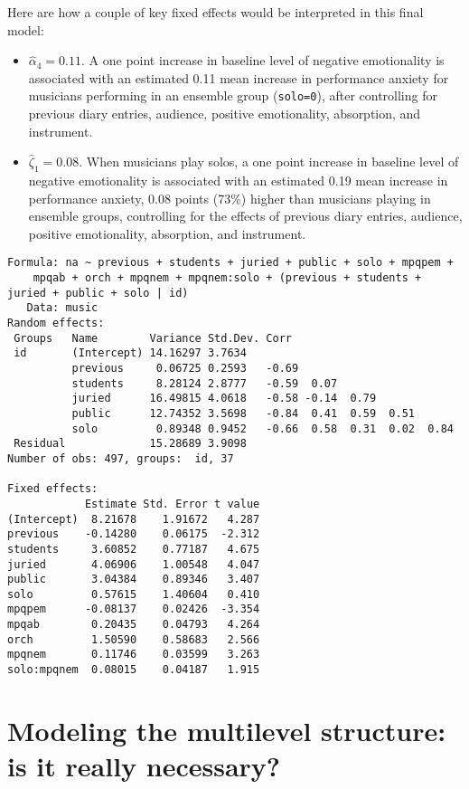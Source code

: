 \documentclass[
]{krantz}
\providecommand{\tightlist}{%
  \setlength{\itemsep}{0pt}\setlength{\parskip}{0pt}}
\begin{document}
Here are how a couple of key fixed effects would be interpreted in this final model:

\begin{itemize}
\tightlist
\item
  \(\hat{\alpha}_{4} = 0.11\). A one point increase in baseline level of negative emotionality is associated with an estimated 0.11 mean increase in performance anxiety for musicians performing in an ensemble group (\texttt{solo=0}), after controlling for previous diary entries, audience, positive emotionality, absorption, and instrument.
\item
  \(\hat{\zeta}_{1} = 0.08\). When musicians play solos, a one point increase in baseline level of negative emotionality is associated with an estimated 0.19 mean increase in performance anxiety, 0.08 points (73\%) higher than musicians playing in ensemble groups, controlling for the effects of previous diary entries, audience, positive emotionality, absorption, and instrument.
\end{itemize}

\begin{verbatim}
Formula: na ~ previous + students + juried + public + solo + mpqpem +  
    mpqab + orch + mpqnem + mpqnem:solo + (previous + students +      juried + public + solo | id)
   Data: music
Random effects:
 Groups   Name        Variance Std.Dev. Corr                         
 id       (Intercept) 14.16297 3.7634                                
          previous     0.06725 0.2593   -0.69                        
          students     8.28124 2.8777   -0.59  0.07                  
          juried      16.49815 4.0618   -0.58 -0.14  0.79            
          public      12.74352 3.5698   -0.84  0.41  0.59  0.51      
          solo         0.89348 0.9452   -0.66  0.58  0.31  0.02  0.84
 Residual             15.28689 3.9098                                
Number of obs: 497, groups:  id, 37

Fixed effects:
            Estimate Std. Error t value
(Intercept)  8.21678    1.91672   4.287
previous    -0.14280    0.06175  -2.312
students     3.60852    0.77187   4.675
juried       4.06906    1.00548   4.047
public       3.04384    0.89346   3.407
solo         0.57615    1.40604   0.410
mpqpem      -0.08137    0.02426  -3.354
mpqab        0.20435    0.04793   4.264
orch         1.50590    0.58683   2.566
mpqnem       0.11746    0.03599   3.263
solo:mpqnem  0.08015    0.04187   1.915
\end{verbatim}

\hypertarget{multinecessary}{%
\section{Modeling the multilevel structure: is it really necessary?}\label{multinecessary}}
\end{document}
